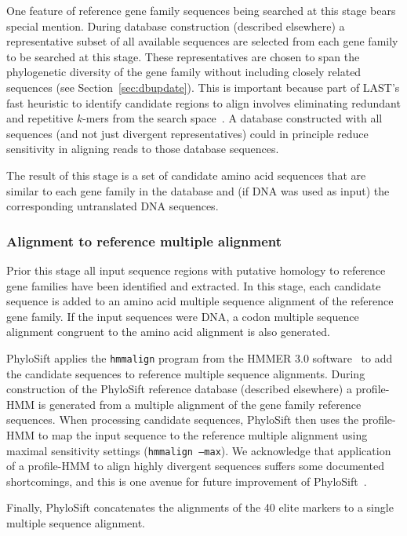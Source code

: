 \documentclass[10pt]{article}
\begin{document}
One feature of reference gene family sequences being searched at this stage bears special mention.
During database construction (described elsewhere) a representative subset of all available sequences are selected from each gene family to be searched at this stage.
These representatives are chosen to span the phylogenetic diversity of the gene family without including closely related sequences (see Section~\ref{sec:dbupdate}).
This is important because part of LAST's fast heuristic to identify candidate regions to align involves eliminating redundant and repetitive $k$-mers from the search space~\cite{Kiełbasa2011}.
A database constructed with all sequences (and not just divergent representatives) could in principle reduce sensitivity in aligning reads to those database sequences.

The result of this stage is a set of candidate amino acid sequences that are similar to each gene family in the database and (if DNA was used as input) the corresponding untranslated DNA sequences.

\subsubsection*{Alignment to reference multiple alignment}
Prior this stage all input sequence regions with putative homology to reference gene families have been identified and extracted.
In this stage, each candidate sequence is added to an amino acid multiple sequence alignment of the reference gene family.
If the input sequences were {DNA}, a codon multiple sequence alignment congruent to the amino acid alignment is also generated.

PhyloSift applies the \texttt{hmmalign} program from the HMMER 3.0 software~\cite{hmmer3} to add the candidate sequences to reference multiple sequence alignments.
During construction of the PhyloSift reference database (described elsewhere) a profile-HMM is generated from a multiple alignment of the gene family reference sequences.
When processing candidate sequences, PhyloSift then uses the profile-HMM to map the input sequence to the reference multiple alignment using maximal sensitivity settings (\texttt{hmmalign --max}).
We acknowledge that application of a profile-HMM to align highly divergent sequences suffers some documented shortcomings, and this is one avenue for future improvement of PhyloSift~\cite{Loytynoja2012}.

Finally, PhyloSift concatenates the alignments of the 40 elite markers to a single multiple sequence alignment.
\end{document}
